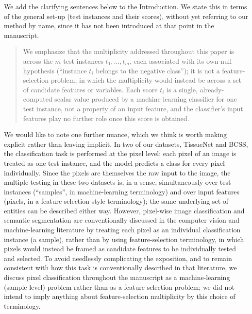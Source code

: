 \documentclass{article}
\newcommand{\response}[1]{\vspace*{1ex} \color{blue} \noindent #1 \color{black}
\vspace*{2ex}}
\newcommand{\edit}[1]{\begin{quotation}\color{red}\noindent #1
\color{black}\end{quotation}}
\begin{document}
{We add the clarifying sentences below to the Introduction. We state this in terms of the general set-up (test instances and their scores), without yet referring to our method by name, since it has not been introduced at that point in the manuscript.

}

\edit{We emphasize that the multiplicity addressed throughout this paper is across the $m$ test instances $t_1,\dots,t_m$, each associated with its own null hypothesis (``instance $t_i$ belongs to the negative class''); it is not a feature-selection problem, in which the multiplicity would instead be across a set of candidate features or variables. Each score $t_i$ is a single, already-computed scalar value produced by a machine learning classifier for one test instance, not a property of an input feature, and the classifier's input features play no further role once this score is obtained.}

\response{We would like to note one further nuance, which we think is worth making explicit rather than leaving implicit. In two of our datasets, TissueNet and BCSS, the classification task is performed at the pixel level: each pixel of an image is treated as one test instance, and the model predicts a class for every pixel individually. Since the pixels are themselves the raw input to the image, the multiple testing in these two datasets is, in a sense, simultaneously over test instances (``samples'', in machine-learning terminology) and over input features (pixels, in a feature-selection-style terminology); the same underlying set of entities can be described either way. However, pixel-wise image classification and semantic segmentation are conventionally discussed in the computer vision and machine-learning literature by treating each pixel as an individual classification instance (a sample), rather than by using feature-selection terminology, in which pixels would instead be framed as candidate features to be individually tested and selected. To avoid needlessly complicating the exposition, and to remain consistent with how this task is conventionally described in that literature, we discuss pixel classification throughout the manuscript as a machine-learning (sample-level) problem rather than as a feature-selection problem; we did not intend to imply anything about feature-selection multiplicity by this choice of terminology.
}
\end{document}
